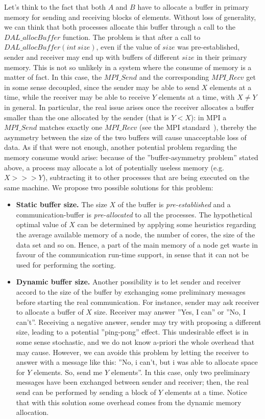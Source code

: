 Let's think to the fact that both $A$ and $B$ have to allocate a buffer in primary memory for sending and receiving blocks of elements. Without loss of generality, we can think that both processes allocate this buffer through a call to the $DAL\_allocBuffer$ function. The problem is that after a call to $DAL\_allocBuffer( int\ size )$, even if the value of $size$ was pre-established, sender and receiver may end up with buffers of different $size$ in their primary memory. This is not so unlikely in a system where the consume of memory is a matter of fact. In this case, the $MPI\_Send$ and the corresponding $MPI\_Recv$ get in some sense decoupled, since the sender may be able to send $X$ elements at a time, while the receiver may be able to receive $Y$ elements at a time, with $X \neq Y$ in general. In particular, the real issue arises once the receiver allocates a buffer smaller than the one allocated by the sender (that is $Y < X$): in MPI a $MPI\_Send$ matches exactly one $MPI\_Recv$ (see the MPI standard~\cite{MPI}), thereby the asymmetry between the size of the two buffers will cause unacceptable loss of data. As if that were not enough, another potential problem regarding the memory consume would arise: because of the ''buffer-asymmetry problem'' stated above, a process may allocate a lot of potentially useless memory (e.g. $X >>> Y$), subtracting it to other processes that are being executed on the same machine. We propose two possible solutions for this problem: 
\begin{itemize}
\item \textbf{Static buffer size.} The size $X$ of the buffer is \textit{pre-established} and a communication-buffer is \textit{pre-allocated} to all the processes. The hypothetical optimal value of $X$ can be determined by applying some heuristics regarding the average available memory of a node, the number of cores, the size of the data set and so on. Hence, a part of the main memory of a node get waste in favour of the communication run-time support, in sense that it can not be used for performing the sorting. 
\item \textbf{Dynamic buffer size.} Another possibility is to let sender and receiver accord to the size of the buffer by exchanging some preliminary messages before starting the real communication. For instance, sender may ask receiver to allocate a buffer of $X$ size. Receiver may answer ''Yes, I can'' or ''No, I can't''. Receiving a negative answer, sender may try with proposing a different size, leading to a potential ''ping-pong'' effect. This undesirable effect is in some sense stochastic, and we do not know a-priori the whole overhead that may cause. However, we can avoide this problem by letting the receiver to answer with a message like this: ''No, i can't, but i was able to allocate space for $Y$ elements. So, send me $Y$ elements''. In this case, only two preliminary messages have been exchanged between sender and receiver; then, the real send can be performed by sending a block of $Y$ elements at a time. Notice that with this solution some overhead comes from the dynamic memory allocation. 
\end{itemize}
